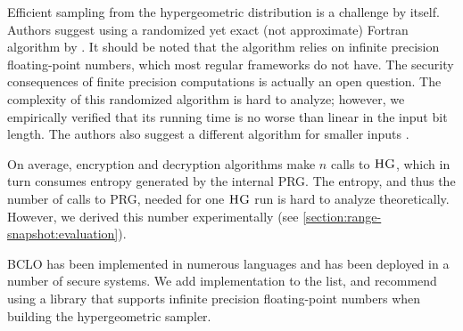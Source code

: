 		Efficient sampling from the hypergeometric distribution is a challenge by itself.
		Authors suggest using a randomized yet exact (not approximate) Fortran algorithm by \textcite{hg-sampler}.
		It should be noted that the algorithm relies on infinite precision floating-point numbers, which most regular frameworks do not have.
		The security consequences of finite precision computations is actually an open question.
		The complexity of this randomized algorithm is hard to analyze; however, we empirically verified that its running time is no worse than linear in the input bit length.
		The authors also suggest a different algorithm for smaller inputs \cite{hg-sampler-small}.

		On average, encryption and decryption algorithms make $n$ calls to $\textsc{HG}$, which in turn consumes entropy generated by the internal PRG\@.
		The entropy, and thus the number of calls to PRG, needed for one $\textsc{HG}$ run is hard to analyze theoretically.
		However, we derived this number experimentally (see \cref{section:range-snapshot:evaluation}).

		BCLO has been implemented in numerous languages and has been deployed in a number of secure systems.
		We add {\Csharp} implementation to the list, and recommend using a library that supports infinite precision floating-point numbers when building the hypergeometric sampler.
